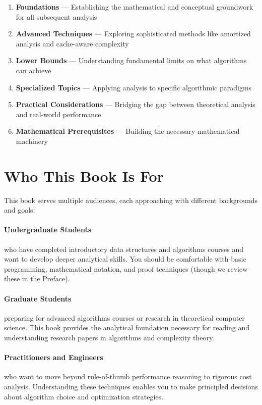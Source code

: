 \begin{enumerate}
    \item \textbf{Foundations} — Establishing the mathematical and conceptual groundwork for all subsequent analysis
    \item \textbf{Advanced Techniques} — Exploring sophisticated methods like amortized analysis and cache-aware complexity
    \item \textbf{Lower Bounds} — Understanding fundamental limits on what algorithms can achieve
    \item \textbf{Specialized Topics} — Applying analysis to specific algorithmic paradigms
    \item \textbf{Practical Considerations} — Bridging the gap between theoretical analysis and real-world performance
    \item \textbf{Mathematical Prerequisites} — Building the necessary mathematical machinery
\end{enumerate}

\section*{Who This Book Is For}

This book serves multiple audiences, each approaching with different backgrounds and goals:

\paragraph{Undergraduate Students} who have completed introductory data structures and algorithms courses and want to develop deeper analytical skills. You should be comfortable with basic programming, mathematical notation, and proof techniques (though we review these in the Preface).

\paragraph{Graduate Students} preparing for advanced algorithms courses or research in theoretical computer science. This book provides the analytical foundation necessary for reading and understanding research papers in algorithms and complexity theory.

\paragraph{Practitioners and Engineers} who want to move beyond rule-of-thumb performance reasoning to rigorous cost analysis. Understanding these techniques enables you to make principled decisions about algorithm choice and optimization strategies.

